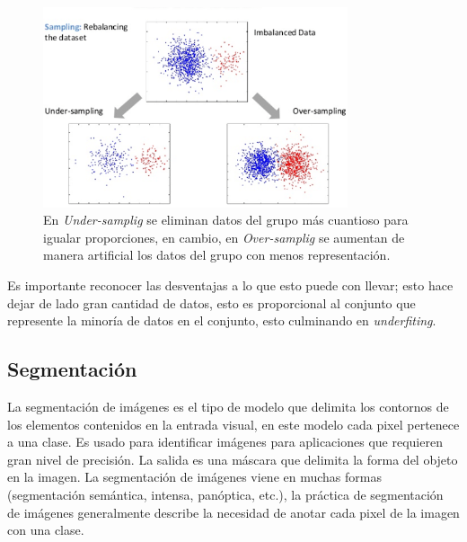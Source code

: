 \documentclass[letter,12pt]{report}
\begin{document}
\begin{figure}[H]
    \centering
    \includegraphics[width=0.8\textwidth]{balance}
    \caption{En \textit{Under-samplig} se eliminan datos del grupo más cuantioso para
        igualar proporciones, en cambio, en \textit{Over-samplig} se aumentan de manera
    artificial los datos del grupo con menos representación.}
    \label{fig:balance}
\end{figure}

Es importante reconocer las desventajas a lo que esto puede con llevar; esto hace dejar
de lado gran cantidad de datos, esto es proporcional al conjunto que represente la
minoría de datos en el conjunto, esto culminando en \textit{underfiting}.

\subsection{Segmentación}
La segmentación \cite{Segmenta} de imágenes es el tipo de modelo que delimita los
contornos de los elementos contenidos en la entrada visual, en este modelo cada pixel
pertenece a una clase. Es usado para identificar imágenes para aplicaciones que requieren
gran nivel de precisión. La salida es una máscara que delimita la forma del objeto en la
imagen. La segmentación de imágenes viene en muchas formas (segmentación semántica,
intensa, panóptica, etc.), la práctica de segmentación de imágenes generalmente describe
la necesidad de anotar cada pixel de la imagen con una clase.
\end{document}
